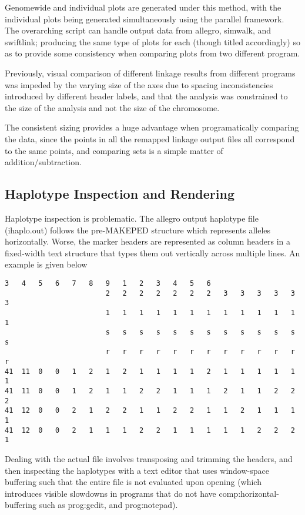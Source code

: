 Genomewide and individual plots are generated under this method, with the individual plots being generated simultaneously using the parallel framework. The overarching script can handle output data from allegro, simwalk, and swiftlink; producing the same type of plots for each (though titled accordingly) so as to provide some consistency when comparing plots from two different program.

Previously, visual comparison of different linkage results from different programs was impeded by the varying size of the axes due to spacing inconsistencies introduced by different header labels, and that the analysis was constrained to the size of the analysis and not the size of the chromosome.

The consistent sizing provides a huge advantage when programatically comparing the data, since the points in all the remapped linkage output files all correspond to the same points, and comparing sets is a simple matter of addition/subtraction.


\subsection{Haplotype Inspection and Rendering}

Haplotype inspection is problematic. The allegro output haplotype file (ihaplo.out) follows the pre-MAKEPED structure which represents alleles horizontally. Worse, the marker headers are represented as column headers in a fixed-width text structure that types them out vertically across multiple lines. An example is given below

\begingroup
\begin{spacing}{1}
\begin{lstlisting}[label=verb:inhaplo]
						3	4	5	6	7	8	9 	1	2	3	4	5	6
						2	2	2	2	2	2	2	3	3	3	3	3	3
						1	1	1	1	1	1	1	1	1	1	1	1	1
						s	s	s	s	s	s	s	s	s	s	s	s	s
      					r	r	r	r	r	r	r	r	r	r	r	r	r
41	11	0	0	1	2	1	2	1	1	1	1	2	1	1	1	1	1	1
41	11	0	0	1	2	1	1	2	2	1	1	1	2	1	1	2	2	2
41	12	0	0	2	1	2	2	1	1	2	2	1	1	2	1	1	1	1
41	12	0	0	2	1	1	1	2	2	1	1	1	1	1	2	2	2	1
\end{lstlisting}
\vspace{-9pt}
\end{spacing}
\endgroup

Dealing with the actual file involves transposing and trimming the headers, and then inspecting the haplotypes with a text editor that uses window-space buffering such that the entire file is not evaluated upon opening (which introduces visible slowdowns in programs that do not have \gls{comp:horizontal-buffering} such as \gls{prog:gedit}, and \gls{prog:notepad}).

